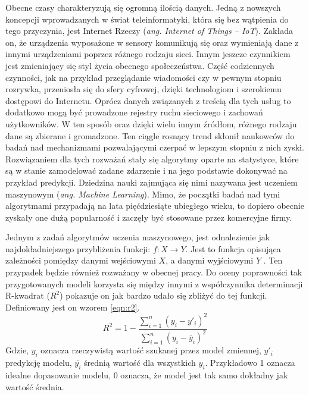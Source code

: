 Obecne czasy charakteryzują się ogromną ilością danych. Jedną z nowszych koncepcji wprowadzanych w świat teleinformatyki, która się bez wątpienia do tego przyczynia, jest Internet Rzeczy (\textit{ang. Internet of Things --  IoT}). Zakłada on, że urządzenia wyposażone w sensory komunikują się oraz wymieniają dane z innymi urządzeniami poprzez różnego rodzaju sieci. Innym jeszcze czynnikiem jest zmieniający się styl życia obecnego społeczeństwa. Część codziennych czynności, jak na przykład przeglądanie  wiadomości czy w pewnym stopniu rozrywka, przeniosła się do sfery cyfrowej, dzięki technologiom i szerokiemu dostępowi do Internetu. Oprócz danych związanych z treścią dla tych usług to dodatkowo mogą być prowadzone rejestry ruchu sieciowego i zachowań użytkowników. W ten sposób oraz dzięki wielu innym źródłom, różnego rodzaju dane są zbierane i gromadzone. Ten ciągle rosnący trend skłonił naukowców do badań nad mechanizmami pozwalającymi czerpać w lepszym stopniu z nich zyski. Rozwiązaniem dla tych rozważań stały się algorytmy oparte na statystyce, które są w stanie zamodelować zadane zdarzenie i na jego podstawie dokonywać na przykład predykcji. Dziedzina nauki zajmująca się nimi nazywana jest uczeniem maszynowym ({\em ang. Machine Learning}). Mimo, że początki badań nad tymi algorytmami  przypadają na lata pięćdziesiąte ubiegłego wieku, to dopiero obecnie zyskały one dużą popularność i zaczęły być stosowane przez komercyjne firmy. \par  


Jednym z zadań algorytmów uczenia maszynowego, jest odnalezienie jak najdokładniejszego przybliżenia funkcji: $f \colon X \to Y$. Jest to funkcja opisująca zależności pomiędzy danymi wejściowymi $X$, a danymi wyjściowymi $Y$ \cite{ml_supervised}. Ten przypadek będzie również rozważany w obecnej pracy. Do oceny poprawności tak przygotowanych modeli korzysta się między innymi z współczynnika determinacji R-kwadrat ($R^2$) pokazuje on jak bardzo udało się zbliżyć do tej funkcji. Definiowany jest on wzorem \ref{eqn:r2}. 
\begin{equation}
\label{eqn:r2}
R^2=1- \frac{ \sum_{i=1}^{n}(y_i-y'_i)^2}{\sum_{i=1}^{n}(y_i-\bar{y}_i)^2 }
\end{equation}
Gdzie, $y_i$ oznacza rzeczywistą wartość szukanej przez model zmiennej, $y'_i$ predykcję modelu, $\bar{y_i}$ średnią wartość dla wszystkich $y_i$. Przykładowo 1 oznacza idealne dopasowanie modelu, 0 oznacza, że model jest tak samo dokładny jak wartość średnia.\par

